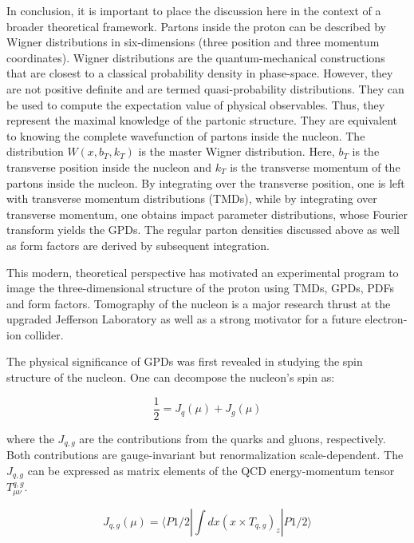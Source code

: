             In conclusion, it is important to place the discussion here in the context of a broader theoretical framework. Partons inside the proton can be described by Wigner distributions in six-dimensions (three position and three momentum coordinates). Wigner distributions are the quantum-mechanical constructions that are closest to a classical probability density in phase-space. However, they are not positive definite and are termed quasi-probability distributions. They can be used to compute the expectation value of physical observables. Thus, they represent the maximal knowledge of the partonic structure. They are equivalent to knowing the complete wavefunction of partons inside the nucleon. The distribution $W(x, b_T, k_T)$ is the master Wigner distribution. Here, $b_T$ is the transverse position inside the nucleon and $k_T$ is the transverse momentum of the partons inside the nucleon. By integrating over the transverse position, one is left with transverse momentum distributions (TMDs), while by integrating over transverse momentum, one obtains impact parameter distributions, whose Fourier transform yields the GPDs. The regular parton densities discussed above as well as form factors are derived by subsequent integration.
            
            This modern, theoretical perspective has motivated an experimental program to image the three-dimensional structure of the proton using TMDs, GPDs, PDFs and form factors. Tomography of the nucleon is a major research thrust at the upgraded Jefferson Laboratory as well as a strong motivator for a future electron-ion collider.


                         The physical significance of GPDs was first revealed in studying the spin structure of the nucleon. One can decompose the nucleon's spin as:          
               
            \begin{equation}
            \frac{1}{2} = J_q(\mu) + J_g(\mu)
            \end{equation}
            
            where the $J_{q,g}$ are the contributions from the quarks and gluons, respectively. Both contributions are gauge-invariant but renormalization scale-dependent. The $J_{q,g}$ can be expressed as matrix elements of the QCD energy-momentum tensor $T_{\mu \nu}^{q,g}$.
            
            \begin{equation}
            J_{q,g}(\mu) = \langle P1/2 \left| \int dx(x \times T_{q,g})_z \right| P1/2 \rangle
            \end{equation}
        
